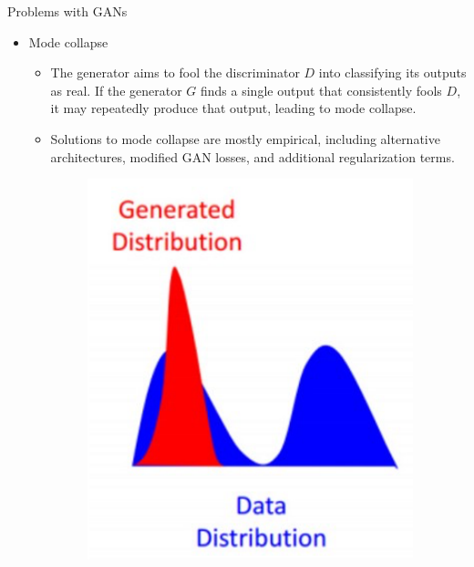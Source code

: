 \begin{frame}[allowframebreaks]{Problems with GANs}
\framebreak
\begin{itemize}
    \item Mode collapse
    \begin{itemize}
        \item The generator aims to fool the discriminator $D$ into classifying its outputs as real. If the generator $G$ finds a single output that consistently fools $D$, it may repeatedly produce that output, leading to mode collapse.
        \item Solutions to mode collapse are mostly empirical, including alternative architectures, modified GAN losses, and additional regularization terms.
        
        \begin{figure}
            \centering
            \includegraphics[height=0.4\textheight, width=\textwidth, keepaspectratio]{images/gan/gan_mode_collapse_1.png}
        \end{figure}
    \end{itemize}
\end{itemize}


\end{frame}
